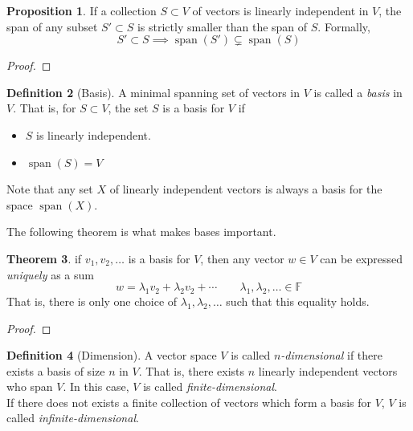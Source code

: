 \documentclass[11pt, reqno]{amsart}
\newcommand{\op}[1]{\operatorname{#1}}
\theoremstyle{definition} %
\newtheorem{theorem}{Theorem}[section]
\newtheorem{definition}[theorem]{Definition}
\newtheorem{proposition}[theorem]{Proposition}
\newcommand{\F}{\mathbb{F}}
\begin{document}
\begin{proposition}
    If a collection $S\subset V$ of vectors is linearly independent in $V$, the span of any subset $S'\subset S$ is strictly smaller than the span of $S$. Formally,
    \begin{equation}
        S'\subset S\implies \op{span}(S')\subsetneq \op{span}(S)
    \end{equation}
    \begin{proof}
        
    \end{proof}
\end{proposition}

\begin{definition}[Basis]
    A minimal spanning set of vectors in $V$ is called a \emph{basis} in $V$. That is, for $S\subset V$, the set $S$ is a basis for $V$ if
    \begin{itemize}
        \item $S$ is linearly independent.
        \item $\op{span}(S)=V$
    \end{itemize}
    Note that any set $X$ of linearly independent vectors is always a basis for the space $\op{span}(X)$.
\end{definition}

The following theorem is what makes bases important.

\begin{theorem}
    if $v_1,v_2,\dots$ is a basis for $V$, then any vector $w\in V$ can be expressed \emph{uniquely} as a sum
    \begin{equation}
        w=\lambda_1v_2+\lambda_2v_2+\cdots\qquad \lambda_1,\lambda_2,\dots\in \F
    \end{equation}
    That is, there is only one choice of $\lambda_1,\lambda_2,\dots$ such that this equality holds.
    \begin{proof}
        
    \end{proof}
\end{theorem}

\begin{definition}[Dimension]
    A vector space $V$ is called \emph{$n$-dimensional} if there exists a basis of size $n$ in $V$. That is, there exists $n$ linearly independent vectors who span $V$. In this case, $V$ is called \emph{finite-dimensional}.\\
    \indent If there does not exists a finite collection of vectors which form a basis for $V$, $V$ is called \emph{infinite-dimensional}.
\end{definition}
\end{document}
